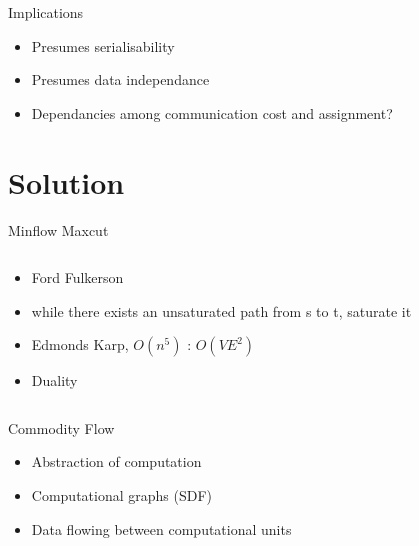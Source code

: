 \documentclass{beamer}
\begin{document}
\begin{frame}{Implications}
\begin{itemize}
	\item Presumes serialisability
	\item Presumes data independance
	\item Dependancies among communication cost and assignment?
\end{itemize}
\end{frame}

\section{Solution}

\begin{frame}{Minflow Maxcut}
\begin{columns}
\begin{column}{5cm}
\begin{itemize}
	\item Ford Fulkerson
	\item while there exists an unsaturated path from s to t, saturate it
	\item Edmonds Karp, $O(n^5)$ : $O(VE^2)$
	\item Duality
\end{itemize}
\end{column}
\begin{column}{5cm}
\end{column}
\end{columns}
\end{frame}

\begin{frame}{Commodity Flow}
\begin{itemize}
	\item Abstraction of computation
	\item Computational graphs (SDF)
	\item Data flowing between computational units
\end{itemize}
\end{frame}
\end{document}
